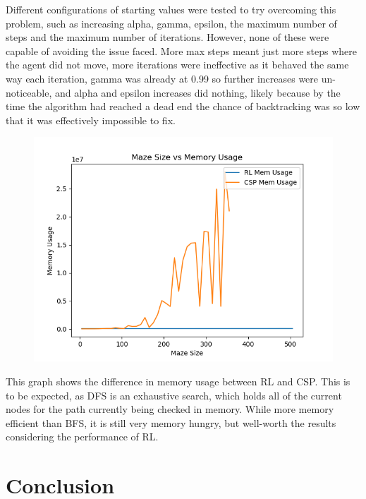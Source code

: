 \documentclass{article}
\newcommand\tab[1][1cm]{\hspace*{#1}}
\begin{document}
         \tab Different configurations of starting values were tested to try 
         overcoming this problem, such as increasing alpha, gamma, epsilon, 
         the maximum number of steps and the maximum number of iterations. 
         However, none of these were capable of avoiding the issue faced. 
         More max steps meant just more steps where the agent did not move, more
         iterations were ineffective as it behaved the same way each iteration, 
         gamma was already at 0.99 so further increases were un-noticeable, 
         and alpha and epsilon increases did nothing, likely because by the 
         time the algorithm had reached a dead end the chance of backtracking 
         was so low that it was effectively impossible to fix.

        \begin{figure}[ht]
            \centering
            \includegraphics[scale=0.6]{assets/MemOnly.png}
            \label{MemOnly}
        \end{figure}

         \tab This graph shows the difference in memory usage between RL and CSP. 
         This is to be expected, as DFS is an exhaustive search, which holds 
         all of the current nodes for the path currently being checked in 
         memory. While more memory efficient than BFS, it is still very 
         memory hungry, but well-worth the results considering the 
         performance of RL.

    \section{Conclusion}\label{sec:conclusion}
\end{document}
